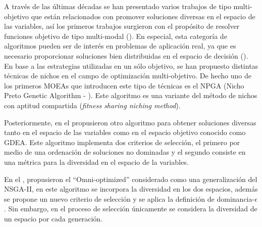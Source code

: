 A través de las últimas décadas se han presentado varios trabajos de tipo multi-objetivo que están relacionados con promover soluciones diversas en el espacio de las variables, así los primeros trabajos surgieron con el propósito de resolver funciones objetivo de tipo multi-modal (\cite{preuss2006pareto}).
%
En especial, esta categoría de algoritmos pueden ser de interés en problemas de aplicación real, ya que es necesario proporcionar soluciones bien distribuidas en el espacio de decisión (\cite{deb2005omni, rudolph2007capabilities}).
%
En base a las estrategias utilizadas en un sólo objetivo, se han propuesto distintas técnicas de nichos en el campo de optimización multi-objetivo.
%
De hecho uno de los primeros MOEAs que introducen este tipo de técnicas es el NPGA (Nicho Preto Genetic Algorithm - \cite{Joel:NPGA}).
%
Este algoritmo es una variante del método de nichos con aptitud compartida (\textit{fitness sharing niching method}).

%
Posteriormente, \citeauthor{toffolo2003genetic} en el \citeyear{toffolo2003genetic} propusieron otro algoritmo para obtener soluciones diversas tanto en el espacio de las variables como en el espacio objetivo conocido como GDEA.
%
Este algoritmo implementa dos criterios de selección, el primero por medio de una ordenación de soluciones no dominadas y el segundo consiste en una métrica para la diversidad en el espacio de la variables.
%

En el \citeyear{deb2005omni}, \citeauthor{deb2005omni} propusieron el ``Omni-optimized'' considerado como una generalización del NSGA-II, en este algoritmo se incorpora la diversidad en los dos espacios, además se propone un nuevo criterio de selección y se aplica la definición de dominancia-$\epsilon$.
%
Sin embargo, en el proceso de selección únicamente se considera la diversidad de un espacio por cada generación.
%

